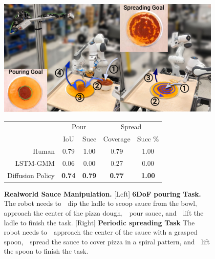 \documentclass[Afour,sageh,times]{sagej}
\newcommand\todo[1]{\textcolor{red}{[TODO: #1]}}
\begin{document}
\begin{figure}[t]
\centering
\includegraphics[width=\linewidth]{figure/real_sauce_setup.pdf}

\vspace{1.5mm}


\small
\begin{tabular}{r|c|c|c|c}
\toprule
         & \multicolumn{2}{c|}{Pour} & \multicolumn{2}{c}{Spread}    \\
         & IoU & Succ & Coverage & Succ \% \\
\midrule
Human  & 0.79 &     1.00  & 0.79  &    1.00      \\
\midrule
LSTM-GMM & 0.06 & 0.00  &  0.27  & 0.00           \\
Diffusion Policy  &  \textbf{0.74} &\textbf{0.79}   & \textbf{0.77}  & \textbf{1.00}   \\
\bottomrule
\end{tabular}


\caption{\textbf{Realworld Sauce Manipulation. } 
\label{fig:real_sauce_manipulation}
[Left] \textbf{6DoF pouring Task.} The robot needs to \textcircled{} dip the ladle to scoop sauce from the bowl, \textcircled{} approach the center of the pizza dough, \textcircled{} pour sauce, and \textcircled{} lift the ladle to finish the task.
[Right] \textbf{Periodic spreading Task} The robot needs to \textcircled{} approach the center of the sauce with a grasped spoon, \textcircled{} spread the sauce to cover pizza in a spiral pattern, and \textcircled{} lift the spoon to finish the task.
}

\vspace{-4mm}
\end{figure}
\end{document}
